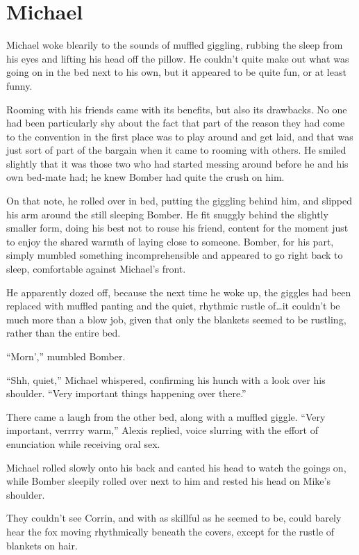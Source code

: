 \chapter{Michael}

Michael woke blearily to the sounds of muffled giggling, rubbing the sleep from his eyes and lifting his head off the pillow.  He couldn't quite make out what was going on in the bed next to his own, but it appeared to be quite fun, or at least funny.

Rooming with his friends came with its benefits, but also its drawbacks. No one had been particularly shy about the fact that part of the reason they had come to the convention in the first place was to play around and get laid, and that was just sort of part of the bargain when it came to rooming with others.  He smiled slightly that it was those two who had started messing around before he and his own bed-mate had; he knew Bomber had quite the crush on him.

On that note, he rolled over in bed, putting the giggling behind him, and slipped his arm around the still sleeping Bomber.  He fit snuggly behind the slightly smaller form, doing his best not to rouse his friend, content for the moment just to enjoy the shared warmth of laying close to someone.  Bomber, for his part, simply mumbled something incomprehensible and appeared to go right back to sleep, comfortable against Michael's front.

He apparently dozed off, because the next time he woke up, the giggles had been replaced with muffled panting and the quiet, rhythmic rustle of\ldots{}it couldn't be much more than a blow job, given that only the blankets seemed to be rustling, rather than the entire bed.

``Morn','' mumbled Bomber.

``Shh, quiet,'' Michael whispered, confirming his hunch with a look over his shoulder.  ``Very important things happening over there.''

There came a laugh from the other bed, along with a muffled giggle. ``Very important, verrrry warm,'' Alexis replied, voice slurring with the effort of enunciation while receiving oral sex.

Michael rolled slowly onto his back and canted his head to watch the goings on, while Bomber sleepily rolled over next to him and rested his head on Mike's shoulder.

They couldn't see Corrin, and with as skillful as he seemed to be, could barely hear the fox moving rhythmically beneath the covers, except for the rustle of blankets on hair.

